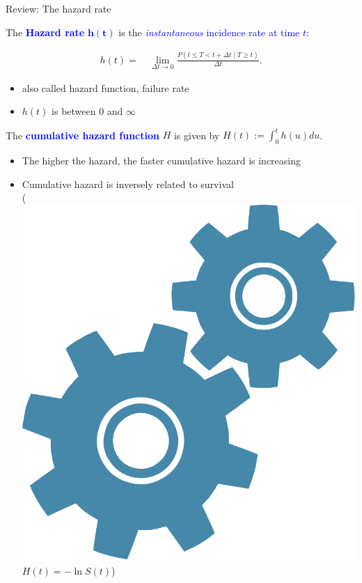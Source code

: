 \documentclass[10pt,t]{beamer}
\begin{document}
\begin{frame}{Review: The hazard rate}
	
	\vspace{-5 mm}

	The \textcolor{blue}{\textbf{Hazard rate} $\mathbf{h(t)}$} is the \textcolor{blue}{\textit{instantaneous} incidence rate at time $t$:}

	\smallskip
	\color{blue}
	\begin{align*}
	h(t) = & \ \lim_{\Delta t \to 0} \frac{P(t \leq T < t + \Delta t \mid T \geq t)}{\Delta t}.
	\end{align*} 

	\begin{itemize}
		
		\item also called hazard function, failure rate
		
		
		\medskip
		
		\item $h(t)$ is between 0 and $\infty$	
		
		
	\end{itemize}
	
	
	\medskip
	
	The \textcolor{blue}{\textbf{cumulative hazard function}} $H$ is given by $H(t) := \int_0^t h(u) du$.
	
	\medskip
	
	\begin{itemize}
		\item The higher the hazard, the faster cumulative hazard is increasing
		
		\medskip
		
	\item Cumulative hazard is inversely related to survival\\ (\includegraphics[scale = 0.01]{figs/technical} $H(t)=-\ln S(t)$)
	\end{itemize}



\end{frame}
\end{document}
